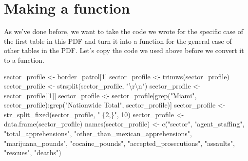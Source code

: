 \documentclass[
]{krantz}
\makeatletter
\newenvironment{Shaded}{\begin{snugshade}}{\end{snugshade}}
\newcommand{\DecValTok}[1]{\textcolor[rgb]{0.06,0.06,0.06}{#1}}
\newcommand{\FunctionTok}[1]{\textcolor[rgb]{0,0,0}{#1}}
\newcommand{\NormalTok}[1]{#1}
\newcommand{\OtherTok}[1]{\textcolor[rgb]{0.37,0.37,0.37}{#1}}
\newcommand{\SpecialCharTok}[1]{\textcolor[rgb]{0,0,0}{#1}}
\newcommand{\StringTok}[1]{\textcolor[rgb]{0.5,0.5,0.5}{#1}}
\newenvironment{kframe}{%
\medskip{}
\setlength{\fboxsep}{.8em}
 \def\at@end@of@kframe{}%
 \ifinner\ifhmode%
  \def\at@end@of@kframe{\end{minipage}}%
  \begin{minipage}{\columnwidth}%
 \fi\fi%
 \def\FrameCommand##1{\hskip\@totalleftmargin \hskip-\fboxsep
 \colorbox{shadecolor}{##1}\hskip-\fboxsep
     \hskip-\linewidth \hskip-\@totalleftmargin \hskip\columnwidth}%
 \MakeFramed {\advance\hsize-\width
   \@totalleftmargin\z@ \linewidth\hsize
   \@setminipage}}%
 {\par\unskip\endMakeFramed%
 \at@end@of@kframe}
\renewenvironment{Shaded}{\begin{kframe}}{\end{kframe}}
\makeatother
\begin{document}
\hypertarget{making-a-function}{%
\section{Making a function}\label{making-a-function}}

As we've done before, we want to take the code we wrote for the specific case of the first table in this PDF and turn it into a function for the general case of other tables in the PDF. Let's copy the code we used above before we convert it to a function.

\begin{Shaded}
\begin{Highlighting}[]
\NormalTok{sector\_profile }\OtherTok{\textless{}{-}}\NormalTok{ border\_patrol[}\DecValTok{1}\NormalTok{]}
\NormalTok{sector\_profile }\OtherTok{\textless{}{-}} \FunctionTok{trimws}\NormalTok{(sector\_profile)}
\NormalTok{sector\_profile }\OtherTok{\textless{}{-}} \FunctionTok{strsplit}\NormalTok{(sector\_profile, }\StringTok{"}\SpecialCharTok{\textbackslash{}r\textbackslash{}n}\StringTok{"}\NormalTok{)}
\NormalTok{sector\_profile }\OtherTok{\textless{}{-}}\NormalTok{ sector\_profile[[}\DecValTok{1}\NormalTok{]]}
\NormalTok{sector\_profile }\OtherTok{\textless{}{-}}\NormalTok{ sector\_profile[}\FunctionTok{grep}\NormalTok{(}\StringTok{"Miami"}\NormalTok{, sector\_profile)}\SpecialCharTok{:}\FunctionTok{grep}\NormalTok{(}\StringTok{"Nationwide Total"}\NormalTok{, sector\_profile)]}
\NormalTok{sector\_profile }\OtherTok{\textless{}{-}} \FunctionTok{str\_split\_fixed}\NormalTok{(sector\_profile, }\StringTok{" \{2,\}"}\NormalTok{, }\DecValTok{10}\NormalTok{)}
\NormalTok{sector\_profile }\OtherTok{\textless{}{-}} \FunctionTok{data.frame}\NormalTok{(sector\_profile)}
\FunctionTok{names}\NormalTok{(sector\_profile) }\OtherTok{\textless{}{-}} \FunctionTok{c}\NormalTok{(}\StringTok{"sector"}\NormalTok{,}
                           \StringTok{"agent\_staffing"}\NormalTok{,}
                           \StringTok{"total\_apprehensions"}\NormalTok{,}
                           \StringTok{"other\_than\_mexican\_apprehensions"}\NormalTok{, }
                           \StringTok{"marijuana\_pounds"}\NormalTok{,}
                           \StringTok{"cocaine\_pounds"}\NormalTok{,}
                           \StringTok{"accepted\_prosecutions"}\NormalTok{,}
                           \StringTok{"assaults"}\NormalTok{,}
                           \StringTok{"rescues"}\NormalTok{,}
                           \StringTok{"deaths"}\NormalTok{)}
\end{Highlighting}
\end{Shaded}
\end{document}
